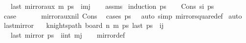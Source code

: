 \begin{isabellebody}
\ \ \ {\isachardoublequoteopen}last\ {\isacharparenleft}{\kern0pt}mirror{}{\isacharunderscore}{\kern0pt}aux\ m\ ps{\isacharparenright}{\kern0pt}\ {\isacharequal}{\kern0pt}\ {\isacharparenleft}{\kern0pt}i{\isacharcomma}{\kern0pt}m{\isacharminus}{\kern0pt}j{\isacharparenright}{\kern0pt}{\isachardoublequoteclose}\isanewline
%
\isadelimproof
\ \ %
\endisadelimproof
%
\isatagproof
{}\isamarkupfalse%
\ assms\isanewline
{}\isamarkupfalse%
\ {\isacharparenleft}{\kern0pt}induction\ ps{\isacharparenright}{\kern0pt}\isanewline
\ \ \isamarkupfalse%
\ {\isacharparenleft}{\kern0pt}Cons\ s\isactrlsub i\ ps{\isacharparenright}{\kern0pt}\isanewline
\ \ \isamarkupfalse%
\ \isamarkupfalse%
\ {\isacharquery}{\kern0pt}case\ \isanewline
\ \ \ \ \isamarkupfalse%
\ mirror{}{\isacharunderscore}{\kern0pt}aux{\isacharunderscore}{\kern0pt}nil\ Cons\ \isamarkupfalse%
\ {\isacharparenleft}{\kern0pt}cases\ {\isachardoublequoteopen}ps\ {\isacharequal}{\kern0pt}\ {\isacharbrackleft}{\kern0pt}{\isacharbrackright}{\kern0pt}{\isachardoublequoteclose}{\isacharparenright}{\kern0pt}\ {\isacharparenleft}{\kern0pt}auto\ simp{\isacharcolon}{\kern0pt}\ mirror{}{\isacharunderscore}{\kern0pt}square{\isacharunderscore}{\kern0pt}def{\isacharparenright}{\kern0pt}\isanewline
{}\isamarkupfalse%
\ auto%
\endisatagproof
{\isafoldproof}%
%
\isadelimproof
\isanewline
%
\endisadelimproof
\isanewline
{}\isamarkupfalse%
\ last{\isacharunderscore}{\kern0pt}mirror{}{\isacharcolon}{\kern0pt}\isanewline
\ \ \ {\isachardoublequoteopen}knights{\isacharunderscore}{\kern0pt}path\ {\isacharparenleft}{\kern0pt}board\ n\ m{\isacharparenright}{\kern0pt}\ ps{\isachardoublequoteclose}\ {\isachardoublequoteopen}last\ ps\ {\isacharequal}{\kern0pt}\ {\isacharparenleft}{\kern0pt}i{\isacharcomma}{\kern0pt}j{\isacharparenright}{\kern0pt}{\isachardoublequoteclose}\isanewline
\ \ \ {\isachardoublequoteopen}last\ {\isacharparenleft}{\kern0pt}mirror{}\ ps{\isacharparenright}{\kern0pt}\ {\isacharequal}{\kern0pt}\ {\isacharparenleft}{\kern0pt}i{\isacharcomma}{\kern0pt}int\ m{\isacharplus}{\kern0pt}{}{\isacharminus}{\kern0pt}j{\isacharparenright}{\kern0pt}{\isachardoublequoteclose}\isanewline
%
\isadelimproof
\ \ %
\endisadelimproof
%
\isatagproof
{}\isamarkupfalse%
\ mirror{}{\isacharunderscore}{\kern0pt}def\ \isamarkupfalse%

\end{isabellebody}
